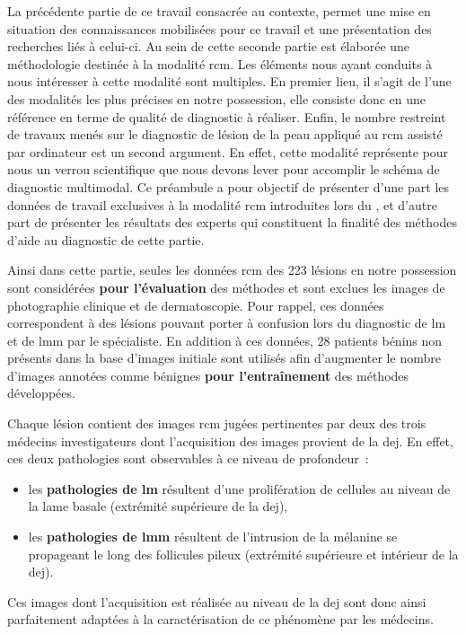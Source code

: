 \renewcommand{\thechapter}{\roman{chapter}}
\setcounter{chapter}{3}
\setcounter{figure}{0}

\label{chap:preamble_microscopy}
La précédente partie de ce travail consacrée au contexte, permet une mise en situation des connaissances mobilisées pour ce travail et une présentation des recherches liés à celui-ci. Au sein de cette seconde partie est élaborée une méthodologie destinée à la modalité \gls{rcm}. Les éléments nous ayant conduits à nous intéresser à cette modalité sont multiples. En premier lieu, il s'agit de l'une des modalités les plus précises en notre possession, elle consiste donc en une référence en terme de qualité de diagnostic à réaliser. Enfin, le nombre restreint de travaux menés sur le diagnostic de lésion de la peau appliqué au \gls{rcm} assisté par ordinateur est un second argument. En effet, cette modalité représente pour nous un verrou scientifique que nous devons lever pour accomplir le schéma de diagnostic multimodal. Ce préambule a pour objectif de présenter d'une part les données de travail exclusives à la modalité \gls{rcm} introduites lors du , et d'autre part de présenter les résultats des experts qui constituent la finalité des méthodes d'aide au diagnostic de cette partie.\par

Ainsi dans cette partie, seules les données \gls{rcm} des 223 lésions en notre possession sont considérées \textbf{pour l'évaluation} des méthodes et sont exclues les images de photographie clinique et de dermatoscopie. Pour rappel, ces données correspondent à des lésions pouvant porter à confusion lors du diagnostic de \gls{lm} et de \gls{lmm} par le spécialiste. En addition à ces données, 28 patients bénins non présents dans la base d'images initiale sont utilisés afin d'augmenter le nombre d'images annotées comme bénignes \textbf{pour l'entraînement} des méthodes développées.\par

Chaque lésion contient des images \gls{rcm} jugées pertinentes par deux des trois médecins investigateurs dont l'acquisition des images provient de la \gls{dej}. En effet, ces deux pathologies sont observables à ce niveau de profondeur~:
\begin{itemize}
    \item les \textbf{pathologies de \gls{lm}} résultent d'une prolifération de cellules au niveau de la lame basale (extrémité supérieure de la \gls{dej}),
    \item les \textbf{pathologies de \gls{lmm}} résultent de l'intrusion de la mélanine se propageant le long des follicules pileux (extrémité supérieure et intérieur de la \gls{dej}).
\end{itemize} Ces images dont l'acquisition est réalisée au niveau de la \gls{dej} sont donc ainsi parfaitement adaptées à la caractérisation de ce phénomène par les médecins.\par

